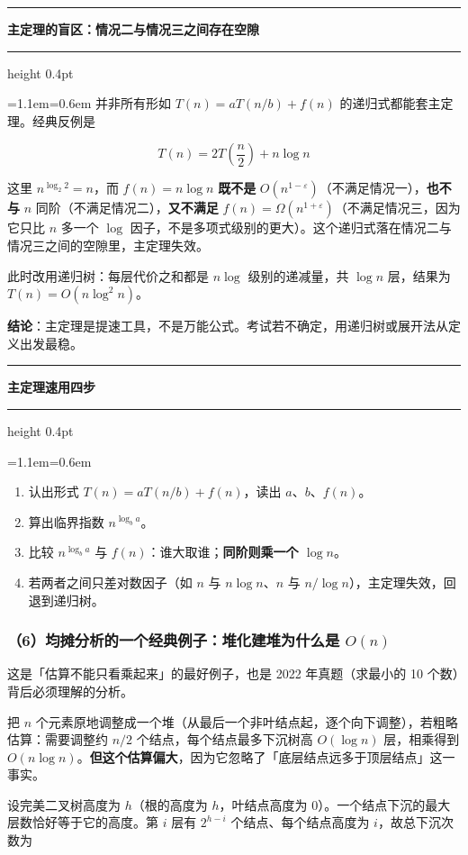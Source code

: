 \documentclass[11pt,openany,UTF8]{ctexbook}
\newcommand{\callouthead}[2]{%
  \par\addvspace{7pt}\noindent
  {\color{#1}\rule[-0.15em]{3pt}{1.05em}}\hspace{0.5em}%
  {\bfseries\color{#1}#2}\par\nobreak\vspace{-0.35em}%
  {\color{rulesep}\hrule height 0.4pt}\nobreak\vspace{0.45em}%
  \begingroup\small\setlength{\parindent}{0pt}%
  \leftskip=1.1em\rightskip=0.6em\noindent\ignorespaces}
\newcommand{\calloutend}{\par\endgroup\addvspace{7pt}}
\newenvironment{callkey}[1]{\callouthead{keybar}{#1}}{\calloutend}
\newenvironment{callwarn}[1]{\callouthead{warnbar}{#1}}{\calloutend}
\begin{document}
\begin{callwarn}{主定理的盲区：情况二与情况三之间存在空隙}
并非所有形如 $T(n)=aT(n/b)+f(n)$ 的递归式都能套主定理。经典反例是

\[T(n)=2T\left(\frac n2\right)+n\log n\]

这里 $n^{\log_2 2}=n$，而 $f(n)=n\log n$ \textbf{既不是} $O(n^{1-\varepsilon})$（不满足情况一），\textbf{也不与} $n$ 同阶（不满足情况二），\textbf{又不满足} $f(n)=\Omega(n^{1+\varepsilon})$（不满足情况三，因为它只比 $n$ 多一个 $\log$ 因子，不是多项式级别的更大）。这个递归式落在情况二与情况三之间的空隙里，主定理失效。

此时改用递归树：每层代价之和都是 $n\log$ 级别的递减量，共 $\log n$ 层，结果为 $T(n)=O(n\log^2 n)$。

\textbf{结论}：主定理是提速工具，不是万能公式。考试若不确定，用递归树或展开法从定义出发最稳。

\end{callwarn}

\begin{callkey}{主定理速用四步}
\begin{enumerate}
\item 认出形式 $T(n)=aT(n/b)+f(n)$，读出 $a$、$b$、$f(n)$。
\item 算出临界指数 $n^{\log_b a}$。
\item 比较 $n^{\log_b a}$ 与 $f(n)$：谁大取谁；\textbf{同阶则乘一个 $\log n$}。
\item 若两者之间只差对数因子（如 $n$ 与 $n\log n$、$n$ 与 $n/\log n$），主定理失效，回退到递归树。
\end{enumerate}
\end{callkey}

\subsubsection{（6）均摊分析的一个经典例子：堆化建堆为什么是 $O(n)$}

这是「估算不能只看乘起来」的最好例子，也是 2022 年真题（求最小的 10 个数）背后必须理解的分析。

把 $n$ 个元素原地调整成一个堆（从最后一个非叶结点起，逐个向下调整），若粗略估算：需要调整约 $n/2$ 个结点，每个结点最多下沉树高 $O(\log n)$ 层，相乘得到 $O(n\log n)$。\textbf{但这个估算偏大}，因为它忽略了「底层结点远多于顶层结点」这一事实。

设完美二叉树高度为 $h$（根的高度为 $h$，叶结点高度为 0）。一个结点下沉的最大层数恰好等于它的高度。第 $i$ 层有 $2^{h-i}$ 个结点、每个结点高度为 $i$，故总下沉次数为
\end{document}
